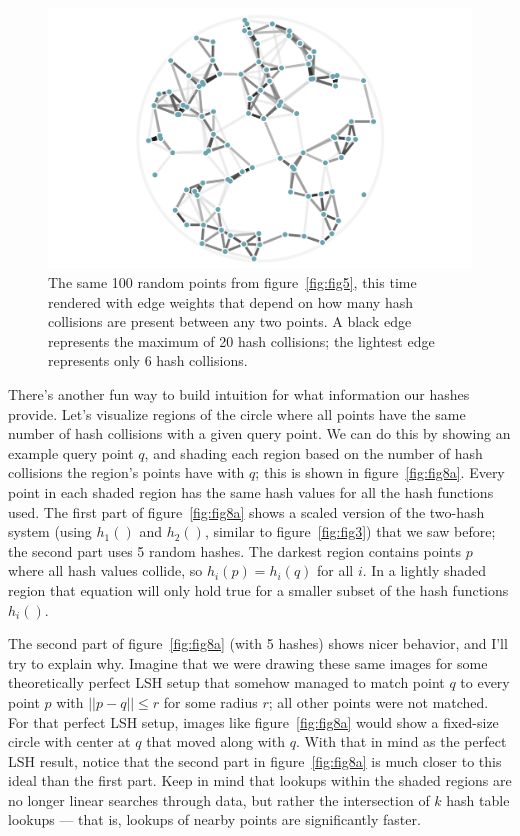 \documentclass[20pt,]{extarticle}
\begin{document}
\begin{figure}
\centering
\includegraphics{images/lsh_image6.png}
\caption{The same 100 random points from figure~\ref{fig:fig5}, this
time rendered with edge weights that depend on how many hash collisions
are present between any two points. A black edge represents the maximum
of 20 hash collisions; the lightest edge represents only 6 hash
collisions.}\label{fig:fig6}
\end{figure}

There's another fun way to build intuition for what information our
hashes provide. Let's visualize regions of the circle where all points
have the same number of hash collisions with a given query point. We can
do this by showing an example query point \(q\), and shading each region
based on the number of hash collisions the region's points have with
\(q\); this is shown in figure~\ref{fig:fig8a}. Every point in each
shaded region has the same hash values for all the hash functions used.
The first part of figure~\ref{fig:fig8a} shows a scaled version of the
two-hash system (using \(h_1()\) and \(h_2()\), similar to
figure~\ref{fig:fig3}) that we saw before; the second part uses 5 random
hashes. The darkest region contains points \(p\) where all hash values
collide, so \(h_i(p) = h_i(q)\) for all \(i\). In a lightly shaded
region that equation will only hold true for a smaller subset of the
hash functions \(h_i().\)

The second part of figure~\ref{fig:fig8a} (with 5 hashes) shows nicer
behavior, and I'll try to explain why. Imagine that we were drawing
these same images for some theoretically perfect LSH setup that somehow
managed to match point \(q\) to every point \(p\) with \(||p-q||\le r\)
for some radius \(r\); all other points were not matched. For that
perfect LSH setup, images like figure~\ref{fig:fig8a} would show a
fixed-size circle with center at \(q\) that moved along with \(q\). With
that in mind as the perfect LSH result, notice that the second part in
figure~\ref{fig:fig8a} is much closer to this ideal than the first part.
Keep in mind that lookups within the shaded regions are no longer linear
searches through data, but rather the intersection of \(k\) hash table
lookups --- that is, lookups of nearby points are significantly faster.
\end{document}
